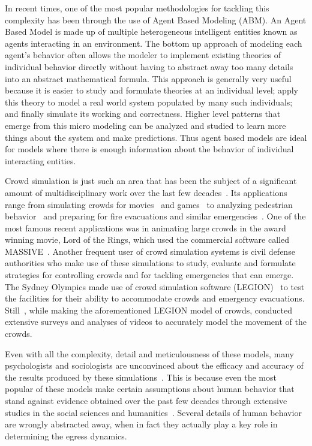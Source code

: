 In recent times, one of the most popular methodologies for tackling this complexity has been through the use of Agent Based Modeling (ABM). An Agent Based Model is made up of multiple heterogeneous intelligent entities known as agents interacting in an environment. The bottom up approach of modeling each agent's behavior often allows the modeler to implement existing theories of individual behavior directly without having to abstract away too many details into an abstract mathematical formula. This approach is generally very useful because it is easier to study and formulate theories at an individual level; apply this theory to model a real world system populated by many such individuals; and finally simulate its working and correctness. Higher level patterns that emerge from this micro modeling can be analyzed and studied to learn more things about the system and make predictions. Thus agent based models are ideal for models where there is enough information about the behavior of individual interacting entities.

Crowd simulation is just such an area that has been the subject of a significant amount of multidisciplinary work over the last few decades~\cite{Still:2000tp,Zhou:2010:CMS:1842722.1842725,Gwynne1999741}. Its applications range from simulating crowds for movies~\cite{Regelous:2011vt,Reynolds:1987vm} and games~\cite{Snape:2012,ageOfEmpires:2013} to analyzing pedestrian behavior~\cite{PhysRevE.51.4282,Viswanathan:ut,Guy:2010uv} and preparing for fire evacuations and similar emergencies~\cite{Klupfel:2005to,PEDFull:2011,Mordvintsev:2012}. One of the most famous recent applications was in animating large crowds in the award winning movie, Lord of the Rings, which used the commercial software called MASSIVE~\cite{Regelous:2011vt}. Another frequent user of crowd simulation systems is civil defense authorities who make use of these simulations to study, evaluate and formulate strategies for controlling crowds and for tackling emergencies that can emerge. The Sydney Olympics made use of crowd simulation software (LEGION)~\cite{Still:2000tp} to test the facilities for their ability to accommodate crowds and emergency evacuations. Still~\cite{Still:2000tp}, while making the aforementioned LEGION model of crowds, conducted extensive surveys and analyses of videos to accurately model the movement of the crowds. 

Even with all the complexity, detail and meticulousness of these models, many psychologists and sociologists are unconvinced about the efficacy and accuracy of the results produced by these simulations~\cite{Aguirre:2004tn,Torres:2010tj,Sime:1995uu}. This is because even the most popular of these models make certain assumptions about human behavior that stand against evidence obtained over the past few decades through extensive studies in the social sciences and humanities~\cite{Torres:2010tj,Sime:1995uu}. Several details of human behavior are wrongly abstracted away, when in fact they actually play a key role in determining the egress dynamics.

